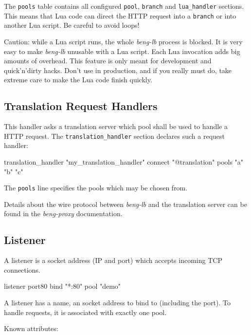\documentclass[a4paper,12pt]{article}
\begin{document}
The \verb|pools| table contains all configured \verb|pool|,
\verb|branch| and \verb|lua_handler| sections.  This means that Lua
code can direct the HTTP request into a \verb|branch| or into another
Lua script.  Be careful to avoid loops!

Caution: while a Lua script runs, the whole \emph{beng-lb} process is
blocked.  It is very easy to make \emph{beng-lb} unusable with a Lua
script.  Each Lua invocation adds big amounts of overhead.  This
feature is only meant for development and quick'n'dirty hacks.  Don't
use in production, and if you really must do, take extreme care to
make the Lua code finish quickly.

\subsection{Translation Request Handlers}

This handler asks a translation server which pool shall be used to
handle a HTTP request.  The \verb|translation_handler| section
declares such a request handler:

\begin{verbatim*}
translation_handler "my_translation_handler" {
  connect "@translation"
  pools "a" "b" "c"
}
\end{verbatim*}

The \verb|pools| line specifies the pools which may be chosen from.

Details about the wire protocol between \emph{beng-lb} and the
translation server can be found in the \emph{beng-proxy}
documentation.

\subsection{Listener}

A listener is a socket address (IP and port) which accepts incoming
TCP connections.

\begin{verbatim*}
listener port80 {
  bind "*:80"
  pool "demo"
}
\end{verbatim*}

A listener has a name, an socket address to bind to (including the
port).  To handle requests, it is associated with exactly one pool.

Known attributes:
\end{document}
